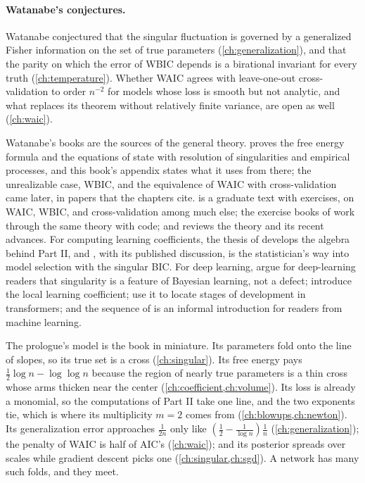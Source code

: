 \begin{refsection}
\paragraph{Watanabe's conjectures.} Watanabe conjectured that the singular fluctuation is governed by a generalized Fisher information on the set of true parameters \parencite[Section~5]{Watanabe2010a} (\cref{ch:generalization}), and that the parity on which the error of WBIC depends is a birational invariant for every truth \parencite[p.~875]{Watanabe2013} (\cref{ch:temperature}). Whether WAIC agrees with leave-one-out cross-validation to order $n^{-2}$ for models whose loss is smooth but not analytic, and what replaces its theorem without relatively finite variance, are open as well (\cref{ch:waic}).


Watanabe's books are the sources of the general theory. \Textcite{Watanabe2009} proves the free energy formula and the equations of state with resolution of singularities and empirical processes, and this book's appendix states what it uses from there; the unrealizable case, WBIC, and the equivalence of WAIC with cross-validation came later, in papers that the chapters cite. \Textcite{Watanabe2018} is a graduate text with exercises, on WAIC, WBIC, and cross-validation among much else; the exercise books of \textcite{Suzuki2023a,Suzuki2023b} work through the same theory with code; and \textcite{Watanabe2024} reviews the theory and its recent advances. For computing learning coefficients, the thesis of \textcite{Lin2011} develops the algebra behind Part II, and \textcite{DrtonPlummer2017}, with its published discussion, is the statistician's way into model selection with the singular BIC. For deep learning, \textcite{WeiEtAl2023} argue for deep-learning readers that singularity is a feature of Bayesian learning, not a defect; \textcite{LauEtAl2025} introduce the local learning coefficient; \textcite{HooglandEtAl2025} use it to locate stages of development in transformers; and the sequence of \textcite{Carroll2023} is an informal introduction for readers from machine learning.


The prologue's model is the book in miniature. Its parameters fold onto the line of slopes, so its true set is a cross (\cref{ch:singular}). Its free energy pays $\tfrac12\log n-\log\log n$ because the region of nearly true parameters is a thin cross whose arms thicken near the center (\cref{ch:coefficient,ch:volume}). Its loss is already a monomial, so the computations of Part II take one line, and the two exponents tie, which is where its multiplicity $m=2$ comes from (\cref{ch:blowups,ch:newton}). Its generalization error approaches $\frac1{2n}$ only like $(\frac12-\frac1{\log n})\frac1n$ (\cref{ch:generalization}); the penalty of WAIC is half of AIC's (\cref{ch:waic}); and its posterior spreads over scales while gradient descent picks one (\cref{ch:singular,ch:sgd}). A network has many such folds, and they meet.


\end{refsection}
